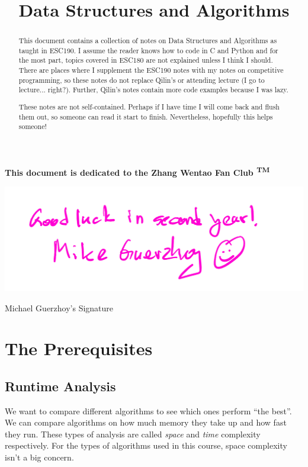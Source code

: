 \documentclass{tufte-handout}
\title{Data Structures and Algorithms}
\begin{document}
\maketitle

\begin{abstract}
This document contains a collection of notes on Data Structures and
Algorithms as taught in ESC190. I assume the reader knows how to code in C and Python and for the most part, topics covered in ESC180 are not explained unless I think I should. There are places where I supplement
the ESC190 notes with my notes on competitive programming, so these
notes do not replace Qilin's or attending lecture (I go to
lecture... right?). Further, Qilin's notes contain more code
examples because I was lazy.

These notes are not self-contained. Perhaps if I have time I will come
back and flush them out, so someone can read it start to
finish. Nevertheless, hopefully this helps someone! \\[2pt]
\end{abstract}

\textbf{\small This document is dedicated to the Zhang Wentao Fan Club \textsuperscript{TM}}

\begin{center}
\begin{marginfigure}
  \centering
  \includegraphics[width=\textwidth]{guerzhoy.jpg}
  \caption{Michael Guerzhoy's Signature}
\end{marginfigure}
\end{center}

\section{The Prerequisites}
\subsection{Runtime Analysis}
We want to compare different algorithms to see which ones perform
``the best''. We can compare algorithms on how much memory they take
up and how fast they run. These types of analysis are called
\textit{space} and \textit{time} complexity respectively. For the
types of algorithms used in this course, space complexity isn't a big concern.
\end{document}
